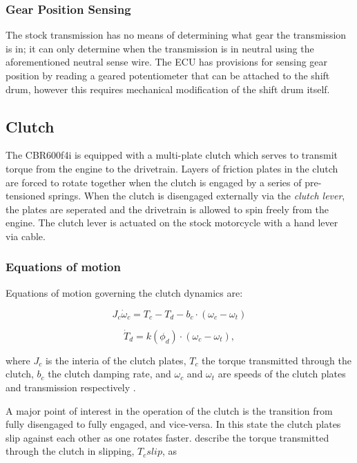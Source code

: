 \subsubsection{Gear Position Sensing}

The stock transmission has no means of determining what gear the transmission is in; it can only determine when the transmission is in neutral using the aforementioned neutral sense wire. The ECU has provisions for sensing gear position by reading a geared potentiometer that can be attached to the shift drum, however this requires mechanical modification of the shift drum itself.

\subsection{Clutch}

The CBR600f4i is equipped with a multi-plate clutch which serves to transmit torque from the engine to the drivetrain. Layers of friction plates in the clutch are forced to rotate together when the clutch is engaged by a series of pre-tensioned springs. When the clutch is disengaged externally via the \emph{clutch lever}, the plates are seperated and the drivetrain is allowed to spin freely from the engine. The clutch lever is actuated on the stock motorcycle with a hand lever via cable.

\subsubsection{Equations of motion}

Equations of motion governing the clutch dynamics are:

\begin{equation}\label{eq:clutch_dynamics_a}
  J_c\dot{\omega}_c=T_c-T_d-b_c\cdot\left(\omega_c-\omega_t\right)
\end{equation}

\begin{equation}\label{eq:clutch_dynamics_b}
  \dot{T}_d=k\left(\phi_d\right)\cdot\left(\omega_c-\omega_t\right),
\end{equation}

where $J_c$ is the interia of the clutch plates, $T_c$ the torque transmitted through the clutch, $b_c$ the clutch damping rate, and $\omega_c$ and $\omega_t$ are speeds of the clutch plates and transmission respectively \cite{clutch_control}.

A major point of interest in the operation of the clutch is the transition from fully disengaged to fully engaged, and vice-versa. In this state the clutch plates slip against each other as one rotates faster.  describe the torque transmitted through the clutch in slipping, $T_c{slip}$, as

